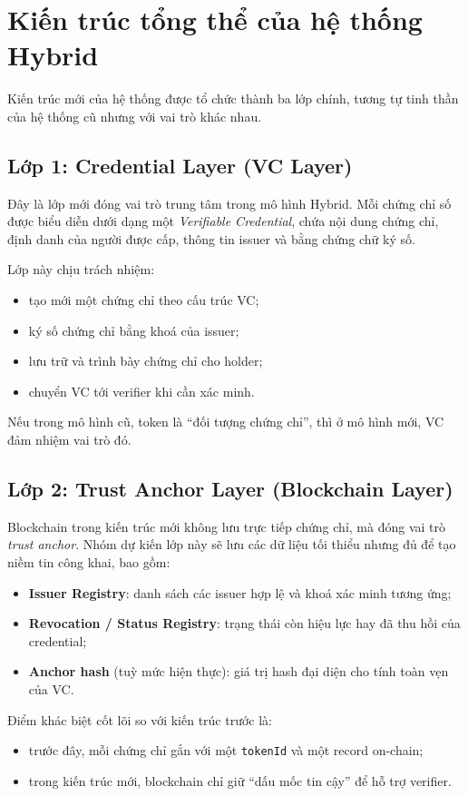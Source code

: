 \section{Kiến trúc tổng thể của hệ thống Hybrid}

Kiến trúc mới của hệ thống được tổ chức thành ba lớp chính, tương tự tinh thần của hệ thống cũ nhưng với vai trò khác nhau.

\subsection{Lớp 1: Credential Layer (VC Layer)}
Đây là lớp mới đóng vai trò trung tâm trong mô hình Hybrid. Mỗi chứng chỉ số được biểu diễn dưới dạng một \textit{Verifiable Credential}, chứa nội dung chứng chỉ, định danh của người được cấp, thông tin issuer và bằng chứng chữ ký số.

Lớp này chịu trách nhiệm:
\begin{itemize}
    \item tạo mới một chứng chỉ theo cấu trúc VC;
    \item ký số chứng chỉ bằng khoá của issuer;
    \item lưu trữ và trình bày chứng chỉ cho holder;
    \item chuyển VC tới verifier khi cần xác minh.
\end{itemize}

Nếu trong mô hình cũ, token là ``đối tượng chứng chỉ'', thì ở mô hình mới, VC đảm nhiệm vai trò đó.

\subsection{Lớp 2: Trust Anchor Layer (Blockchain Layer)}
Blockchain trong kiến trúc mới không lưu trực tiếp chứng chỉ, mà đóng vai trò \textit{trust anchor}. Nhóm dự kiến lớp này sẽ lưu các dữ liệu tối thiểu nhưng đủ để tạo niềm tin công khai, bao gồm:
\begin{itemize}
    \item \textbf{Issuer Registry}: danh sách các issuer hợp lệ và khoá xác minh tương ứng;
    \item \textbf{Revocation / Status Registry}: trạng thái còn hiệu lực hay đã thu hồi của credential;
    \item \textbf{Anchor hash} (tuỳ mức hiện thực): giá trị hash đại diện cho tính toàn vẹn của VC.
\end{itemize}

Điểm khác biệt cốt lõi so với kiến trúc trước là:
\begin{itemize}
    \item trước đây, mỗi chứng chỉ gắn với một \texttt{tokenId} và một record on-chain;
    \item trong kiến trúc mới, blockchain chỉ giữ ``dấu mốc tin cậy'' để hỗ trợ verifier.
\end{itemize}

